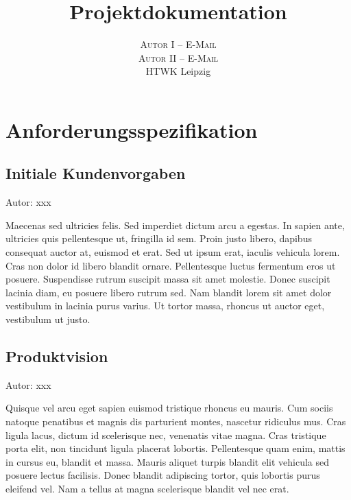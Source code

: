 \documentclass[twoside]{report}
\title{\vspace{-5mm}%
	\fontsize{24pt}{10pt}\selectfont
	\textbf{Projektdokumentation}
	}
\author{%
	\large
	\textsc{Autor I -- E-Mail} \\[2mm]
	\textsc{Autor II -- E-Mail} \\[2mm]
	\normalsize	HTWK Leipzig 
	}
\date{}
\begin{document}

\maketitle
\thispagestyle{fancy}

\tableofcontents


\section{Anforderungsspezifikation}

\subsection{Initiale Kundenvorgaben}
{\small Autor: xxx}

Maecenas sed ultricies felis. Sed imperdiet dictum arcu a egestas. 
In sapien ante, ultricies quis pellentesque ut, fringilla id sem. Proin justo libero, dapibus consequat auctor at, euismod et erat. Sed ut ipsum erat, iaculis vehicula lorem. Cras non dolor id libero blandit ornare. Pellentesque luctus fermentum eros ut posuere. Suspendisse rutrum suscipit massa sit amet molestie. Donec suscipit lacinia diam, eu posuere libero rutrum sed. Nam blandit lorem sit amet dolor vestibulum in lacinia purus varius. Ut tortor massa, rhoncus ut auctor eget, vestibulum ut justo.


\subsection{Produktvision}
{\small Autor: xxx}


Quisque vel arcu eget sapien euismod tristique rhoncus eu mauris. Cum sociis natoque penatibus et magnis dis parturient montes, nascetur ridiculus mus. Cras ligula lacus, dictum id scelerisque nec, venenatis vitae magna. Cras tristique porta elit, non tincidunt ligula placerat lobortis. Pellentesque quam enim, mattis in cursus eu, blandit et massa. Mauris aliquet turpis blandit elit vehicula sed posuere lectus facilisis. Donec blandit adipiscing tortor, quis lobortis purus eleifend vel. Nam a tellus at magna scelerisque blandit vel nec erat.


\end{document}
